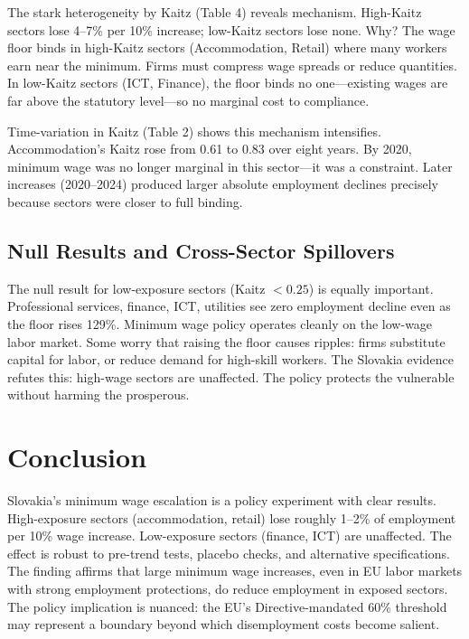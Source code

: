 \documentclass[12pt]{article}
\begin{document}
The stark heterogeneity by Kaitz (Table 4) reveals mechanism. High-Kaitz sectors lose 4--7\% per 10\% increase; low-Kaitz sectors lose none. Why? The wage floor binds in high-Kaitz sectors (Accommodation, Retail) where many workers earn near the minimum. Firms must compress wage spreads or reduce quantities. In low-Kaitz sectors (ICT, Finance), the floor binds no one---existing wages are far above the statutory level---so no marginal cost to compliance.

Time-variation in Kaitz (Table 2) shows this mechanism intensifies. Accommodation's Kaitz rose from 0.61 to 0.83 over eight years. By 2020, minimum wage was no longer marginal in this sector---it was a constraint. Later increases (2020--2024) produced larger absolute employment declines precisely because sectors were closer to full binding.

\subsection*{Null Results and Cross-Sector Spillovers}

The null result for low-exposure sectors (Kaitz $< 0.25$) is equally important. Professional services, finance, ICT, utilities see zero employment decline even as the floor rises 129\%. Minimum wage policy operates cleanly on the low-wage labor market. Some worry that raising the floor causes ripples: firms substitute capital for labor, or reduce demand for high-skill workers. The Slovakia evidence refutes this: high-wage sectors are unaffected. The policy protects the vulnerable without harming the prosperous.

\section{Conclusion}

Slovakia's minimum wage escalation is a policy experiment with clear results. High-exposure sectors (accommodation, retail) lose roughly 1--2\% of employment per 10\% wage increase. Low-exposure sectors (finance, ICT) are unaffected. The effect is robust to pre-trend tests, placebo checks, and alternative specifications. The finding affirms that large minimum wage increases, even in EU labor markets with strong employment protections, do reduce employment in exposed sectors. The policy implication is nuanced: the EU's Directive-mandated 60\% threshold may represent a boundary beyond which disemployment costs become salient.

\label{apep_main_text_end}
\end{document}
